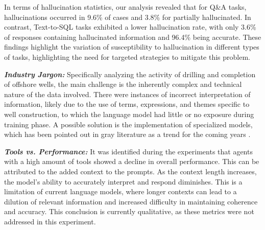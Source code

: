                     In terms of hallucination statistics, our analysis revealed that for Q\&A tasks, hallucinations occurred in 9.6\% of cases and 3.8\% for partially hallucinated. 
                    In contrast, Text-to-SQL tasks exhibited a lower hallucination rate, with only 3.6\% of responses containing hallucinated information and 96.4\% being accurate. 
                    These findings highlight the variation of susceptibility to hallucination in different types of tasks, highlighting the need for targeted strategies to mitigate this problem.
                
                \textbf{\textit{Industry Jargon:}}
                    Specifically analyzing the activity of drilling and completion of offshore wells, the main challenge is the inherently complex and technical nature of the data involved. 
                    There were instances of incorrect interpretation of information, likely due to the use of terms, expressions, and themes specific to well construction, to which the language model had little or no exposure during training phase. 
                    A possible solution is the implementation of specialized models, which has been pointed out in gray literature as a trend for the coming years \citep{Shah2024, Meena2023, Ghosh2023}.
                
                \textbf{\textit{Tools vs. Performance:}} 
                    It was identified during the experiments that agents with a high amount of tools showed a decline in overall performance. 
                    This can be attributed to the added context to the prompts. 
                    As the context length increases, the model's ability to accurately interpret and respond diminishes.
                    This is a limitation of current language models, where longer contexts can lead to a dilution of relevant information and increased difficulty in maintaining coherence and accuracy. 
                    This conclusion is currently qualitative, as these metrics were not addressed in this experiment.

